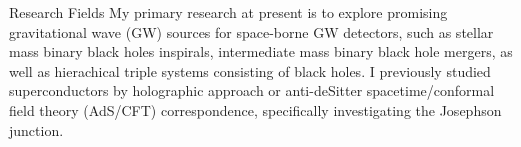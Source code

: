 
\begin{rubric}{Research Fields}
\entry*[GW astronomy]
    My primary research at present is to explore promising gravitational wave (GW) sources for space-borne GW detectors, such as
    stellar mass binary black holes inspirals, intermediate mass binary black hole mergers, as well as hierachical
    triple systems consisting of black holes. 
    I previously studied superconductors by holographic approach or anti-deSitter spacetime/conformal field theory
    (AdS/CFT) correspondence, specifically investigating the Josephson junction. 
\end{rubric}
